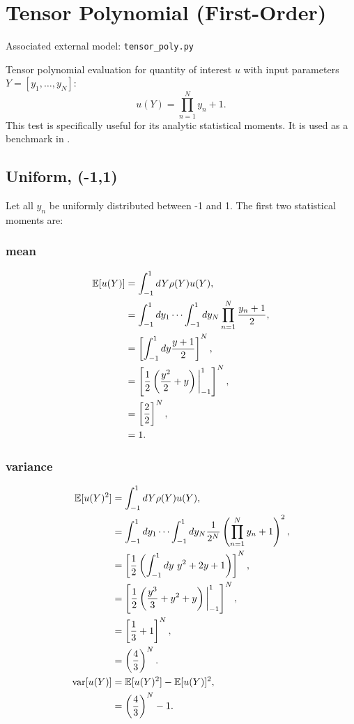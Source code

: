 \section{Tensor Polynomial (First-Order)}
Associated external model: \texttt{tensor\_poly.py}

Tensor polynomial evaluation for quantity of interest $u$ with input parameters $Y=[y_1,\ldots,y_N]$:
\begin{equation}
u(Y) = \prod_{n=1}^N y_n+1.
\end{equation}
This test is specifically useful for its analytic statistical moments.  It is used as a benchmark in
\cite{ayreseaton2015}.

\subsection{Uniform, (-1,1)}
Let all $y_n$ be uniformly distributed between -1 and 1.  The first two statistical moments are:

\subsubsection{mean}
\begin{align}
\mathbb{E}[ u(Y)] &=\int_{-1}^1 dY \rho(Y)u(Y), \notag \\
  &=\int_{-1}^1 dy_1\cdots\int_{-1}^1 dy_N \prod_{n=1}^N \frac{y_n+1}{2},\notag \\
  &=\left[ \int_{-1}^1 dy \frac{y+1}{2}\right]^N,\\
  &=\left[\frac{1}{2}\left(\frac{y^2}{2}+y\right)\bigg|_{-1}^1\right]^N, \notag \\
  &=\left[\frac{2}{2}\right]^N, \notag \\
  &=1. \notag
\end{align}

\subsubsection{variance}
\begin{align}
\mathbb{E}[ u(Y)^2] &= \int_{-1}^1 dY \rho(Y)u(Y),\notag \\
  &=\int_{-1}^1 dy_1\cdots\int_{-1}^1 dy_N \frac{1}{2^N} \left(\prod_{n=1}^N y_n+1\right)^2,\notag \\
  &=\left[\frac{1}{2}\left(\int_{-1}^1 dy\ y^2+2y+1 \right)\right]^N,\\
  &=\left[\frac{1}{2}\left(\frac{y^3}{3}+y^2+y \right)\bigg|_{-1}^1 \right]^N, \notag \\
  &=\left[\frac{1}{3}+1\right]^N, \notag \\
  &=\left(\frac{4}{3}\right)^N.\notag \\
\text{var}[u(Y)] &= \mathbb{E}[ u(Y)^2]-\mathbb{E}[ u(Y)]^2,\notag \\
  &= \left(\frac{4}{3}\right)^N-1.
\end{align}

